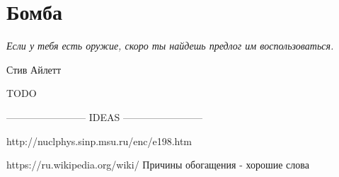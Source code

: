 \chapter{Бомба}\label{ch:the_bomb}

\epigraph{\emph{Если у тебя есть оружие, \break скоро ты найдешь предлог им воспользоваться.}}{Стив Айлетт}

TODO

------------------------ IDEAS ------------------------ 

http://nuclphys.sinp.msu.ru/enc/e198.htm

https://ru.wikipedia.org/wiki/%
Причины обогащения - хорошие слова
